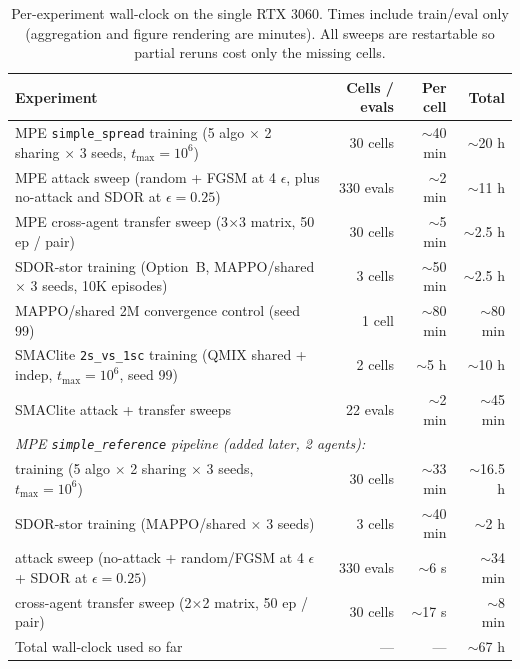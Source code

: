 \documentclass{article}
\begin{document}
\begin{table}[H]
\centering
\small
\setlength{\tabcolsep}{6pt}
\begin{tabular}{lrrr}
\toprule
Experiment & Cells / evals & Per cell & Total \\
\midrule
MPE \texttt{simple\_spread} training (5 algo $\times$ 2 sharing $\times$ 3 seeds, $t_{\max}=10^6$) & 30 cells & $\sim$40 min & $\sim$20 h \\
MPE attack sweep (random + FGSM at 4 $\epsilon$, plus no-attack and SDOR at $\epsilon=0.25$) & 330 evals & $\sim$2 min & $\sim$11 h \\
MPE cross-agent transfer sweep (3$\times$3 matrix, 50 ep / pair) & 30 cells & $\sim$5 min & $\sim$2.5 h \\
SDOR-stor training (Option~B, MAPPO/shared $\times$ 3 seeds, 10K episodes) & 3 cells & $\sim$50 min & $\sim$2.5 h \\
MAPPO/shared 2M convergence control (seed 99) & 1 cell & $\sim$80 min & $\sim$80 min \\
SMAClite \texttt{2s\_vs\_1sc} training (QMIX shared + indep, $t_{\max}=10^6$, seed 99) & 2 cells & $\sim$5 h & $\sim$10 h \\
SMAClite attack + transfer sweeps & 22 evals & $\sim$2 min & $\sim$45 min \\
\midrule
\multicolumn{4}{l}{\textit{MPE \texttt{simple\_reference} pipeline (added later, 2 agents):}} \\
\quad training (5 algo $\times$ 2 sharing $\times$ 3 seeds, $t_{\max}=10^6$) & 30 cells & $\sim$33 min & $\sim$16.5 h \\
\quad SDOR-stor training (MAPPO/shared $\times$ 3 seeds) & 3 cells & $\sim$40 min & $\sim$2 h \\
\quad attack sweep (no-attack + random/FGSM at 4 $\epsilon$ + SDOR at $\epsilon=0.25$) & 330 evals & $\sim$6 s & $\sim$34 min \\
\quad cross-agent transfer sweep (2$\times$2 matrix, 50 ep / pair) & 30 cells & $\sim$17 s & $\sim$8 min \\
\midrule
Total wall-clock used so far & --- & --- & $\sim$67 h \\
\bottomrule
\end{tabular}
\caption{Per-experiment wall-clock on the single RTX 3060. Times include train/eval only (aggregation and figure rendering are minutes). All sweeps are restartable so partial reruns cost only the missing cells.}
\label{tab:time-cost}
\end{table}
\end{document}
